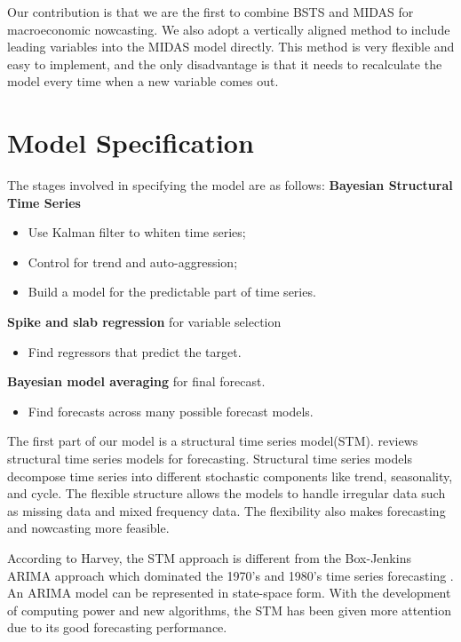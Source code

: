 Our contribution is that we are the first to combine BSTS and MIDAS for macroeconomic nowcasting. We also adopt a vertically aligned method \cite{Altissimo2010} to include leading variables into the MIDAS model directly. This method is very flexible and easy to implement, and the only disadvantage is that it needs to recalculate the model every time when a new variable comes out.


\section{Model Specification}

The stages involved in specifying the model are as follows:
\textbf{Bayesian Structural Time Series} 

\begin{itemize}
	\item {Use Kalman filter to whiten time series;}
	\item {Control for trend and auto-aggression;}
	\item {Build a model for the predictable part of time series.}
\end{itemize}



\noindent \textbf{Spike and slab regression} for variable selection 

\begin{itemize}
	\item {Find regressors that predict the target.}
\end{itemize}

\noindent \textbf{Bayesian model averaging} for final forecast.

\begin{itemize}
	\item {Find forecasts across many possible forecast models.}
\end{itemize}



The first part of our model is a structural time series model(STM).   reviews  structural time series models for forecasting. Structural time series models decompose time series into different stochastic components like trend, seasonality, and cycle. The flexible structure allows the models  to handle irregular data such as missing data and mixed frequency data. The flexibility also makes forecasting and nowcasting more feasible.     

According to Harvey, the STM approach is different from the Box-Jenkins ARIMA approach which dominated the 1970's and 1980's time series forecasting \cite{Harvey2006, Frale2011}. An ARIMA model can be represented in state-space form. With the development of computing power and new algorithms, the STM has been given more attention due to its good forecasting performance.



